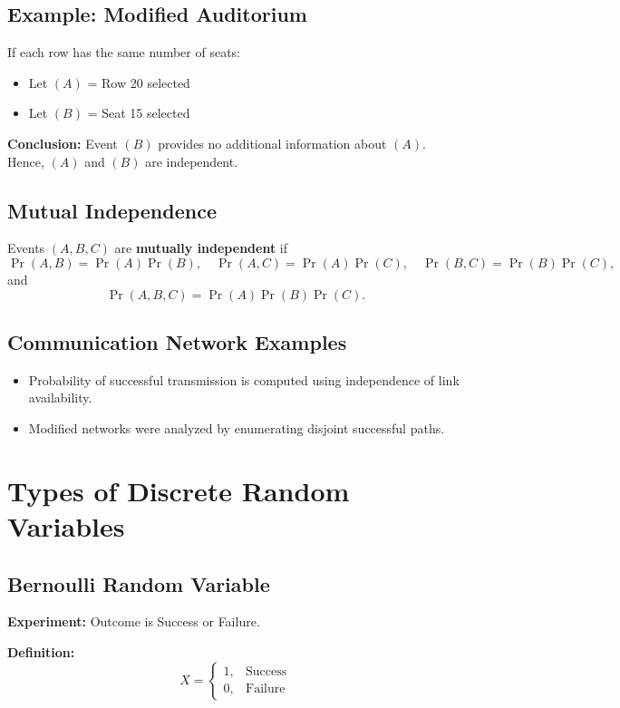 \documentclass[11pt]{article}
\begin{document}
\subsection{Example: Modified Auditorium}

If each row has the same number of seats:
\begin{itemize}
  \item Let $(A)$ = Row 20 selected
  \item Let $(B)$ = Seat 15 selected
\end{itemize}

\textbf{Conclusion:} Event $(B)$ provides no additional information about $(A)$.
Hence, $(A)$ and $(B)$ are independent.

\subsection{Mutual Independence}

Events $(A,B,C)$ are \textbf{mutually independent} if
\[
\Pr(A,B)=\Pr(A)\Pr(B), \quad
\Pr(A,C)=\Pr(A)\Pr(C), \quad
\Pr(B,C)=\Pr(B)\Pr(C),
\]
and
\[
\Pr(A,B,C)=\Pr(A)\Pr(B)\Pr(C).
\]

\subsection{Communication Network Examples}

\begin{itemize}
  \item Probability of successful transmission is computed using independence
        of link availability.
  \item Modified networks were analyzed by enumerating disjoint successful paths.
\end{itemize}

\section{Types of Discrete Random Variables}

\subsection{Bernoulli Random Variable}

\textbf{Experiment:} Outcome is Success or Failure.

\textbf{Definition:}
\[
X =
\begin{cases}
1, & \text{Success} \\
0, & \text{Failure}
\end{cases}
\]
\end{document}
